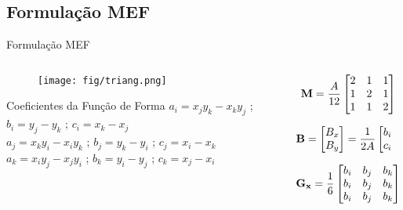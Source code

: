 \documentclass{beamer}
\begin{document}
    \subsection{Formulação MEF}
    \begin{frame}{Formulação MEF}
		\begin{columns}
			\begin{column}{0.5\textwidth}
				\begin{figure}[H]
					\texttt{[image: fig/triang.png]}		
				\end{figure}
				\begin{block}{\small{Coeficientes da Função de Forma}}
			\footnotesize{$a_i = x_j y_k - x_k y_j$ ; $b_i = y_j - y_k$ ; $c_i = x_k - x_j$} \\
			\footnotesize{$a_j = x_k y_i - x_i y_k$ ; $b_j = y_k - y_i$ ; $c_j = x_i - x_k$}\\				
			\footnotesize{$a_k = x_i y_j - x_j y_i$ ; $b_k = y_i - y_j$ ; $c_k = x_j - x_i$} 				
				\end{block}
			\end{column}

			\begin{column}{0.5\textwidth}
			\footnotesize{\begin{equation}
			\mathbf{M} = \frac{A}{12}
				\begin{bmatrix}
					2 & 1 & 1   \\
					1 & 2 & 1   \\
					1 & 1 & 2  
				\end{bmatrix} \notag 
			\end{equation}

			\begin{equation}
			\mathbf{B} =
				\begin{bmatrix}
					B_x   \\
					B_y  
				\end{bmatrix} = \frac{1}{2A}
				\begin{bmatrix}
					b_i & b_j & b_k   \\
					c_i & c_j & c_k   
				\end{bmatrix}\notag 
			\end{equation}

			\begin{equation}
			\mathbf{G_x} = \frac{1}{6}
				\begin{bmatrix}
					b_i & b_j & b_k   \\
					b_i & b_j & b_k   \\
					b_i & b_j & b_k   
					\end{bmatrix}\notag
			\end{equation}

}
\end{column}
\end{columns}
\end{frame}
\end{document}
